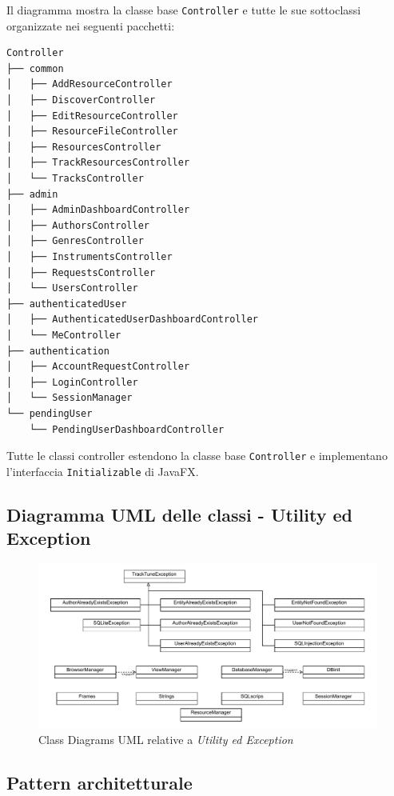 \documentclass[a4paper]{article}
\begin{document}
Il diagramma mostra la classe base \texttt{Controller} e tutte le sue sottoclassi organizzate nei seguenti pacchetti:
\begin{lstlisting}[basicstyle=\ttfamily\small,label={lst:lstlisting}]
Controller
├── common
│   ├── AddResourceController
│   ├── DiscoverController
│   ├── EditResourceController
│   ├── ResourceFileController
│   ├── ResourcesController
│   ├── TrackResourcesController
│   └── TracksController
├── admin
│   ├── AdminDashboardController
│   ├── AuthorsController
│   ├── GenresController
│   ├── InstrumentsController
│   ├── RequestsController
│   └── UsersController
├── authenticatedUser
│   ├── AuthenticatedUserDashboardController
│   └── MeController
├── authentication
│   ├── AccountRequestController
│   ├── LoginController
│   └── SessionManager
└── pendingUser
    └── PendingUserDashboardController
\end{lstlisting}

Tutte le classi controller estendono la classe base \texttt{Controller} e implementano l'interfaccia \texttt{Initializable} di JavaFX.

\subsection{Diagramma UML delle classi - Utility ed Exception}
\begin{figure}[H]
    \centering
    \includegraphics[width=1.1 \textwidth]{./figures/uml_table_altri_package}
    \caption{Class Diagrams UML relative a \textit{Utility ed Exception}}
    \label{fig:uml_table_altri_package}
\end{figure}

\subsection{Pattern architetturale}


\end{document}
